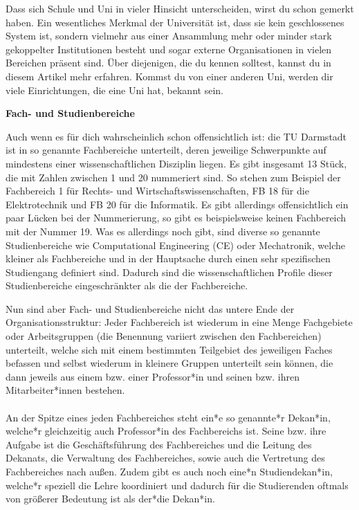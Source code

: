 {Dass sich Schule und Uni in vieler Hinsicht unterscheiden, wirst du schon gemerkt haben. Ein wesentliches Merkmal der Universität ist, dass sie kein geschlossenes System ist, sondern vielmehr aus einer Ansammlung mehr oder minder stark gekoppelter Institutionen besteht und sogar externe Organisationen in vielen Bereichen präsent sind. Über diejenigen, die du kennen solltest, kannst du in diesem Artikel mehr erfahren. Kommst du von einer anderen Uni, werden dir viele Einrichtungen, die eine Uni hat, bekannt sein.
}{\textbf{Fach- und Studienbereiche}

    Auch wenn es für dich wahrscheinlich schon offensichtlich ist: die TU Darmstadt ist in so genannte Fachbereiche unterteilt, deren jeweilige Schwerpunkte auf mindestens einer wissenschaftlichen Disziplin liegen. Es gibt insgesamt 13 Stück, die mit Zahlen zwischen 1 und 20 nummeriert sind. So stehen zum Beispiel der Fachbereich 1 für Rechts- und Wirtschaftswissenschaften, FB 18 für die Elektrotechnik und FB 20 für die Informatik. Es gibt allerdings offensichtlich ein paar Lücken bei der Nummerierung, so gibt es beispielsweise keinen Fachbereich mit der Nummer 19. Was es allerdings noch gibt, sind diverse so genannte Studienbereiche wie Computational Engineering (CE) oder Mechatronik, welche kleiner als Fachbereiche und in der Hauptsache durch einen sehr spezifischen Studiengang definiert sind. Dadurch sind die wissenschaftlichen Profile dieser Studienbereiche eingeschränkter als die der Fachbereiche.

    Nun sind aber Fach- und Studienbereiche nicht das untere Ende der Organisationsstruktur: Jeder Fachbereich ist wiederum in eine Menge Fachgebiete oder Arbeitsgruppen (die Benennung variiert zwischen den Fachbereichen) unterteilt, welche sich mit einem bestimmten Teilgebiet des jeweiligen Faches befassen und selbst wiederum in kleinere Gruppen unterteilt sein können, die dann jeweils aus einem bzw. einer Professor*in und seinen bzw. ihren Mitarbeiter*innen bestehen.
    \\\\
    An der Spitze eines jeden Fachbereiches steht ein*e so genannte*r Dekan*in, welche*r gleichzeitig auch Professor*in des Fachbereichs ist. Seine bzw. ihre Aufgabe ist die Geschäftsführung des Fachbereiches und die Leitung des Dekanats, die Verwaltung des Fachbereiches, sowie auch die Vertretung des Fachbereiches nach außen. Zudem gibt es auch noch eine*n Studiendekan*in, welche*r speziell die Lehre koordiniert und dadurch für die Studierenden oftmals von größerer Bedeutung ist als der*die Dekan*in.\\

}
